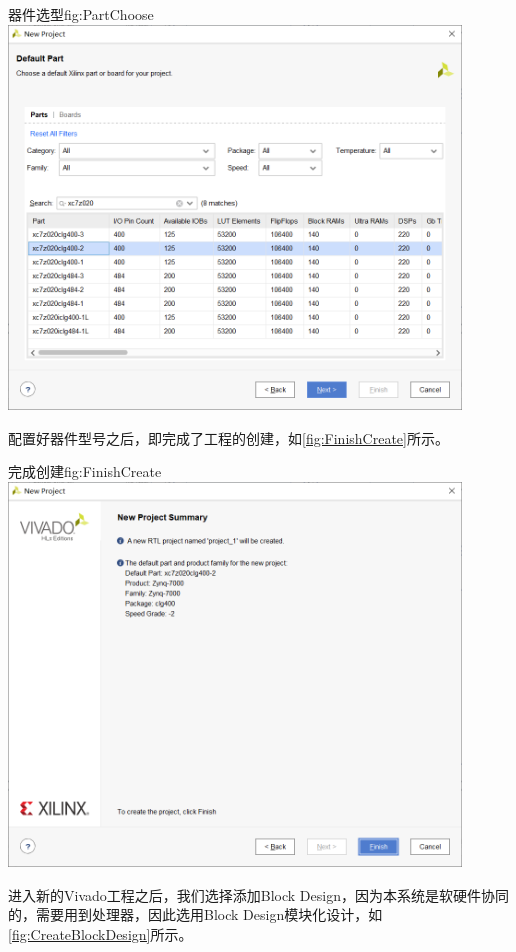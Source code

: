 \documentclass[supercite]{HustGraduPaper}
\begin{document}
	\begin{generalfig}[htb]{器件选型}{fig:PartChoose}
		\includegraphics[width=12cm]{Figures/PartChoose.png}
	\end{generalfig}

	配置好器件型号之后，即完成了工程的创建，如\autoref{fig:FinishCreate}所示。
	
	\begin{generalfig}[htb]{完成创建}{fig:FinishCreate}
		\includegraphics[width=12cm]{Figures/FinishCreate.png}
	\end{generalfig}

	进入新的Vivado工程之后，我们选择添加Block Design，因为本系统是软硬件协同的，需要用到处理器，因此选用Block Design模块化设计，如\autoref{fig:CreateBlockDesign}所示。
	
\end{document}
